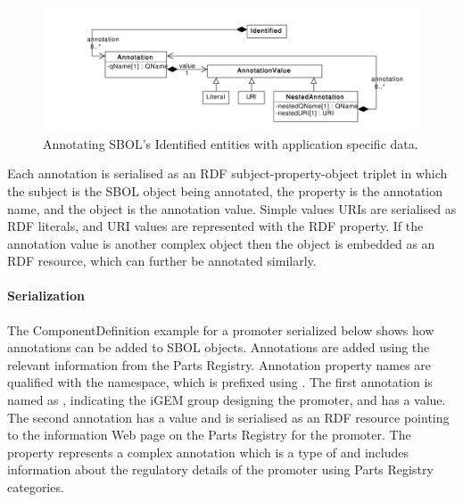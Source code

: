 \begin{figure}[!ht]
\begin{center}
\includegraphics[scale=0.6]{uml/identified_annotations}
\caption[]{Annotating SBOL's Identified entities with application specific data.}
\label{uml:identified_annotations}
\end{center}
\end{figure}

Each annotation is serialised as an RDF subject-property-object triplet in which the subject is the SBOL object being annotated, the property is the annotation name, and the object is the annotation value. Simple values URIs are serialised as RDF literals, and URI values are represented with the  RDF property. If the annotation value is another complex object then the object is embedded as an RDF resource, which can further be annotated similarly.

\paragraph{Serialization}
The ComponentDefinition example for a promoter serialized below shows how annotations can be added to SBOL objects. Annotations are added using the relevant information from the Parts Registry. Annotation property names are qualified with the  namespace, which is prefixed using . The first annotation is named as , indicating the iGEM group designing the promoter, and has a  value. The second  annotation has a  value and is serialised as an RDF resource pointing to the information Web page on the Parts Registry for the promoter. The   property represents a complex annotation which is a type of  and includes information about the regulatory details of the promoter using Parts Registry categories.   

